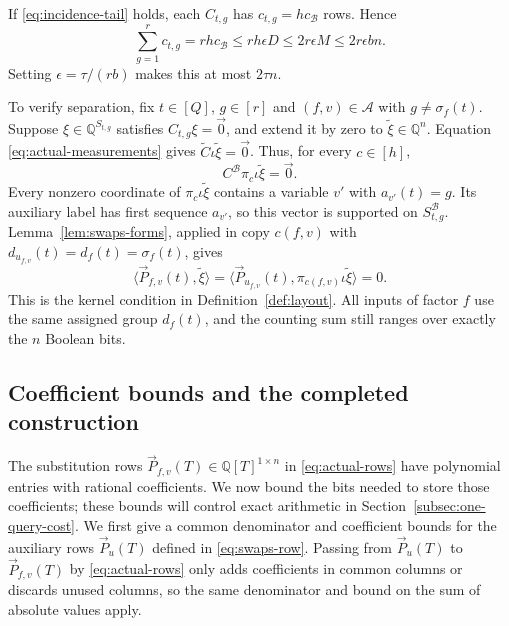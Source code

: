 \documentclass[11pt,reqno]{amsart}
\numberwithin{equation}{section}
\theoremstyle{definition}\newtheorem{definition}[theorem]{Definition}
\theoremstyle{remark}\newtheorem{remark}[theorem]{Remark}
\renewcommand{\le}{\leqslant}
\begin{document}
If \eqref{eq:incidence-tail} holds, each $C_{t,g}$ has
$c_{t,g}=hc_{\mathcal B}$ rows. Hence
\begin{equation}\label{eq:incidence-measurement-count}
 \sum_{g=1}^r c_{t,g}=rh c_{\mathcal B}
 \le rh\epsilon D\le2r\epsilon M\le2r\epsilon bn.
\end{equation}
Setting $\epsilon=\tau/(rb)$ makes this at most $2\tau n$.

To verify separation, fix $t\in[Q]$, $g\in[r]$ and
$(f,v)\in\mathcal A$ with $g\ne\sigma_f(t)$. Suppose
$\xi\in\mathbb Q^{S_{t,g}}$ satisfies $C_{t,g}\xi=\vec{0}$, and extend it
by zero to $\widetilde\xi\in\mathbb Q^n$. Equation
\eqref{eq:actual-measurements} gives
$\widetilde C\iota\widetilde\xi=\vec{0}$. Thus, for every $c\in[h]$,
\[
 C^{\mathcal B}\pi_c\iota\widetilde\xi=\vec{0}.
\]
Every nonzero coordinate of $\pi_c\iota\widetilde\xi$ contains a
variable $v'$ with $a_{v'}(t)=g$. Its auxiliary label has first
sequence $a_{v'}$, so this vector is supported on
$S^{\mathcal B}_{t,g}$. Lemma~\ref{lem:swaps-forms}, applied in copy
$c(f,v)$ with $d_{u_{f,v}}(t)=d_f(t)=\sigma_f(t)$, gives
\[
 \langle \vec{P}_{f,v}(t), \widetilde\xi\rangle
 =\langle \vec{P}_{u_{f,v}}(t), \pi_{c(f,v)}\iota\widetilde\xi\rangle=0.
\]
This is the kernel condition in Definition~\ref{def:layout}.
All inputs of factor $f$ use the same assigned group $d_f(t)$, and
the counting sum still ranges over exactly the $n$ Boolean bits.

\subsection{Coefficient bounds and the completed construction}
The substitution rows $\vec{P}_{f,v}(T)\in\mathbb Q[T]^{1\times n}$ in
\eqref{eq:actual-rows} have polynomial entries with rational
coefficients. We now bound the bits needed to store those coefficients;
these bounds will control exact arithmetic in
Section~\ref{subsec:one-query-cost}.
We first give a common denominator and coefficient bounds for the
auxiliary rows $\vec{P}_u(T)$ defined in \eqref{eq:swaps-row}.
Passing from $\vec{P}_u(T)$ to $\vec{P}_{f,v}(T)$ by \eqref{eq:actual-rows} only
adds coefficients in common columns or discards unused columns,
so the same denominator and bound on the sum of absolute values apply.
\end{document}
